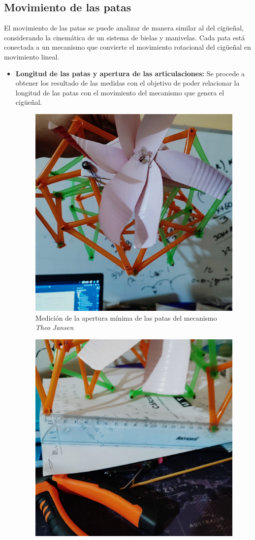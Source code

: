 \begin{multicols}{2}
  \subsection{Movimiento de las patas}
  El movimiento de las patas se puede analizar de manera similar al del cigüeñal, considerando la cinemática de un sistema de bielas y manivelas. Cada pata está conectada a un mecanismo que convierte el movimiento rotacional del cigüeñal en movimiento lineal.
  \begin{itemize}
    \item \textbf{Longitud de las patas y apertura de las articulaciones:} Se procede a obtener los resultado de las medidas con el objetivo de poder relacionar la longitud de las patas con el movimiento del mecanismo que genera el cigüeñal.
    \begin{figure}[H]
      \centering
      \includegraphics[width=0.6\linewidth]{./assets/minima.jpeg}
      \caption{Medición de la apertura mínima de las patas del mecanismo \textit{Theo Jansen}}
      \label{fig:apertura_minima_patas}
    \end{figure}
    \begin{figure}[H]
      \centering
      \includegraphics[width=0.6\linewidth]{./assets/maxima.jpeg}

\end{figure}
\end{itemize}
\end{multicols}
